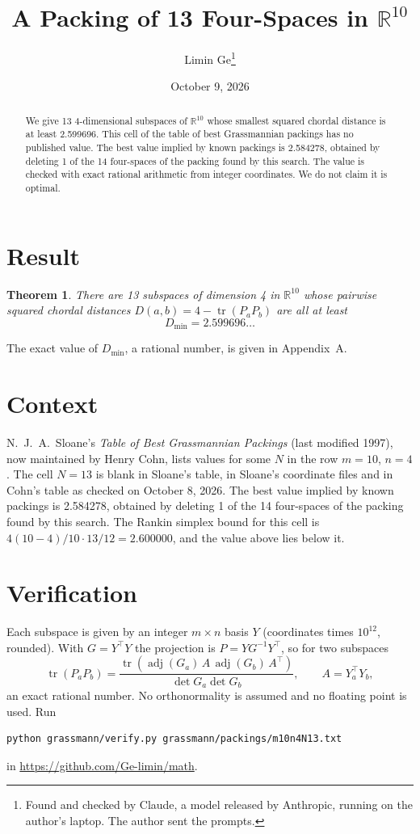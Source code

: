 \documentclass[11pt,a4paper]{article}
\title{A Packing of 13 Four-Spaces in $\mathbb{R}^{10}$}
\author{Limin Ge\thanks{Found and checked by Claude, a model released by Anthropic, running on the author's laptop. The author sent the prompts.}}
\date{October 9, 2026}
\newtheorem*{theorem}{Theorem}
\begin{document}
\maketitle
\begin{abstract}
We give 13 4-dimensional subspaces of $\mathbb{R}^{10}$ whose smallest squared chordal distance is at least 2.599696. This cell of the table of best Grassmannian packings has no published value. The best value implied by known packings is 2.584278, obtained by deleting 1 of the 14 four-spaces of the packing found by this search. The value is checked with exact rational arithmetic from integer coordinates. We do not claim it is optimal.
\end{abstract}

\section{Result}
\begin{theorem}
There are 13 subspaces of dimension 4 in $\mathbb{R}^{10}$ whose pairwise squared chordal distances $D(a,b) = 4 - \operatorname{tr}(P_aP_b)$ are all at least
\[ D_{\min} = 2.599696\ldots \]
\end{theorem}
The exact value of $D_{\min}$, a rational number, is given in Appendix~A.


\section{Context}
N.~J.~A.~Sloane's \emph{Table of Best Grassmannian Packings} (last modified 1997), now maintained by Henry Cohn, lists values for some $N$ in the row $m=10$, $n=4$. The cell $N=13$ is blank in Sloane's table, in Sloane's coordinate files and in Cohn's table as checked on October 8, 2026. The best value implied by known packings is 2.584278, obtained by deleting 1 of the 14 four-spaces of the packing found by this search. The Rankin simplex bound for this cell is $4(10-4)/10\cdot 13/12 = 2.600000$, and the value above lies below it.


\section{Verification}
Each subspace is given by an integer $m\times n$ basis $Y$ (coordinates times $10^{12}$, rounded). With $G=Y^\top Y$ the projection is $P=YG^{-1}Y^\top$, so for two subspaces
\[ \operatorname{tr}(P_aP_b)=\frac{\operatorname{tr}(\operatorname{adj}(G_a)\,A\,\operatorname{adj}(G_b)\,A^\top)}{\det G_a\det G_b},\qquad A=Y_a^\top Y_b, \]
an exact rational number. No orthonormality is assumed and no floating point is used. Run
\begin{verbatim}
python grassmann/verify.py grassmann/packings/m10n4N13.txt
\end{verbatim}
in \url{https://github.com/Ge-limin/math}.
\end{document}
